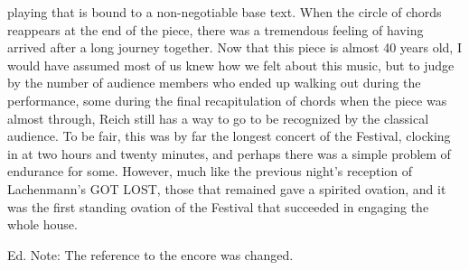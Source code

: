 playing that is bound to a non-negotiable base text. When the circle of chords reappears at the end of the piece, there was a tremendous feeling of having arrived after a long journey together. Now that this piece is almost 40 years old, I would have assumed most of us knew how we felt about this music, but to judge by the number of audience members who ended up walking out during the performance, some during the final recapitulation of chords when the piece was almost through, Reich still has a way to go to be recognized by the classical audience. To be fair, this was by far the longest concert of the Festival, clocking in at two hours and twenty minutes, and perhaps there was a simple problem of endurance for some. However, much like the previous night’s reception of Lachenmann’s GOT LOST, those that remained gave a spirited ovation, and it was the first standing ovation of the Festival that succeeded in engaging the whole house.

Ed. Note: The reference to the encore was changed.